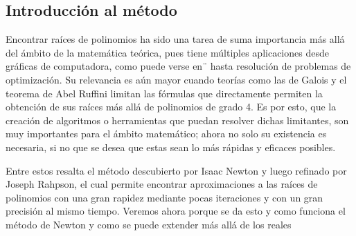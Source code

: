 \subsection{Introducción al método}

Encontrar raíces de polinomios ha sido una tarea de suma importancia más allá del ámbito de la matemática teórica, pues tiene múltiples aplicaciones desde gráficas de computadora, como puede verse en¨\cite{3b1b} hasta resolución de problemas de optimización. Su relevancia es aún mayor cuando teorías como las de Galois y el teorema de Abel Ruffini limitan las fórmulas que directamente permiten la obtención de sus raíces \cite{badger} más allá de polinomios de grado 4.
Es por esto, que la creación de algoritmos o herramientas que puedan resolver dichas limitantes, son muy importantes para el ámbito matemático; ahora no solo su existencia es necesaria, si no que se desea que estas sean lo más rápidas y eficaces posibles. 

Entre estos resalta el método descubierto por Isaac Newton y luego refinado por Joseph Rahpson, el cual permite encontrar aproximaciones a las raíces de polinomios con una gran rapidez mediante pocas iteraciones y con un gran precisión al mismo tiempo. Veremos ahora porque se da esto y como funciona el método de Newton y como se puede extender más allá de los reales